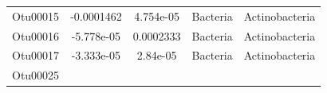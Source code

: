 \documentclass[]{article}
\begin{document}
\begin{longtable}[]{@{}ccccc@{}}
\begin{minipage}[t]{0.13\columnwidth}
Otu00015\strut
\end{minipage} & \begin{minipage}[t]{0.16\columnwidth}\centering\strut
-0.0001462\strut
\end{minipage} & \begin{minipage}[t]{0.14\columnwidth}\centering\strut
4.754e-05\strut
\end{minipage} & \begin{minipage}[t]{0.13\columnwidth}\centering\strut
Bacteria\strut
\end{minipage} & \begin{minipage}[t]{0.27\columnwidth}\centering\strut
Actinobacteria\strut
\end{minipage}\tabularnewline
\begin{minipage}[t]{0.13\columnwidth}\centering\strut
Otu00016\strut
\end{minipage} & \begin{minipage}[t]{0.16\columnwidth}\centering\strut
-5.778e-05\strut
\end{minipage} & \begin{minipage}[t]{0.14\columnwidth}\centering\strut
0.0002333\strut
\end{minipage} & \begin{minipage}[t]{0.13\columnwidth}\centering\strut
Bacteria\strut
\end{minipage} & \begin{minipage}[t]{0.27\columnwidth}\centering\strut
Actinobacteria\strut
\end{minipage}\tabularnewline
\begin{minipage}[t]{0.13\columnwidth}\centering\strut
Otu00017\strut
\end{minipage} & \begin{minipage}[t]{0.16\columnwidth}\centering\strut
-3.333e-05\strut
\end{minipage} & \begin{minipage}[t]{0.14\columnwidth}\centering\strut
2.84e-05\strut
\end{minipage} & \begin{minipage}[t]{0.13\columnwidth}\centering\strut
Bacteria\strut
\end{minipage} & \begin{minipage}[t]{0.27\columnwidth}\centering\strut
Actinobacteria\strut
\end{minipage}\tabularnewline
\begin{minipage}[t]{0.13\columnwidth}\centering\strut
Otu00025\strut
\end{minipage} & \begin{minipage}[t]{0.16\columnwidth}\centering\strut

\end{minipage}
\end{longtable}
\end{document}
